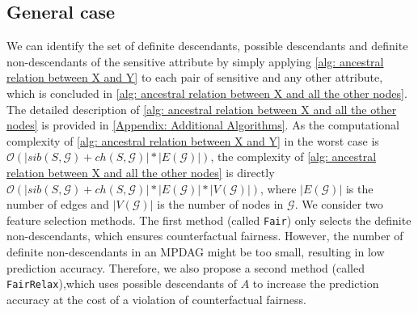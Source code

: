 \documentclass{article}
\begin{document}
\subsection{General case} \label{sec: General Case}
We can identify the set of definite descendants, possible descendants and definite non-descendants of the sensitive attribute by simply applying \cref{alg: ancestral relation between X and Y} to each pair of sensitive and any other attribute, which is concluded in \cref{alg: ancestral relation between X and all the other nodes}.  The detailed description of \cref{alg: ancestral relation between X and all the other nodes} is provided in \cref{Appendix: Additional Algorithms}. As the computational complexity of \cref{alg: ancestral relation between X and Y} in the worst case is $\mathcal{O}(|sib(S,\mathcal{G})+ch(S,\mathcal{G})|*|E(\mathcal{G})|)$, the complexity of \cref{alg: ancestral relation between X and all the other nodes} is directly $\mathcal{O}(|sib(S,\mathcal{G})+ch(S,\mathcal{G})|*|E(\mathcal{G})|*|V(\mathcal{G})|)$, where $|E(\mathcal{G})|$ is the number of edges and $|V(\mathcal{G})|$ is the number of nodes in $\mathcal{G}$. We consider two feature selection methods. The first method (called \texttt{Fair}) only selects the definite non-descendants, which ensures counterfactual fairness. However, the number of definite non-descendants in an MPDAG might be too small, resulting in low prediction accuracy. Therefore, we also propose a second method (called \texttt{FairRelax}),which uses possible descendants of $A$ to increase the prediction accuracy at the cost of a violation of counterfactual fairness.
\end{document}
